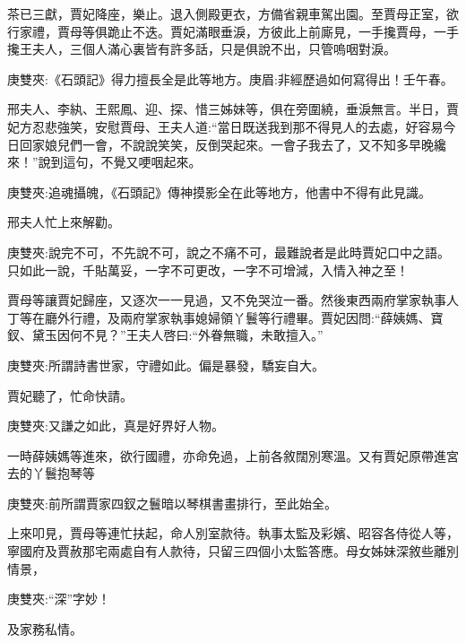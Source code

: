 \begin{parag}
    茶已三獻，賈妃降座，樂止。退入側殿更衣，方備省親車駕出園。至賈母正室，欲行家禮，賈母等俱跪止不迭。賈妃滿眼垂淚，方彼此上前廝見，一手攙賈母，一手攙王夫人，三個人滿心裏皆有許多話，只是俱說不出，只管嗚咽對淚。\begin{note}庚雙夾:《石頭記》得力擅長全是此等地方。庚眉:非經歷過如何寫得出！壬午春。\end{note}邢夫人、李紈、王熙鳳、迎、探、惜三姊妹等，俱在旁圍繞，垂淚無言。半日，賈妃方忍悲強笑，安慰賈母、王夫人道:“當日既送我到那不得見人的去處，好容易今日回家娘兒們一會，不說說笑笑，反倒哭起來。一會子我去了，又不知多早晚纔來！”說到這句，不覺又哽咽起來。\begin{note}庚雙夾:追魂攝魄，《石頭記》傳神摸影全在此等地方，他書中不得有此見識。\end{note}邢夫人忙上來解勸。\begin{note}庚雙夾:說完不可，不先說不可，說之不痛不可，最難說者是此時賈妃口中之語。只如此一說，千貼萬妥，一字不可更改，一字不可增減，入情入神之至！\end{note}賈母等讓賈妃歸座，又逐次一一見過，又不免哭泣一番。然後東西兩府掌家執事人丁等在廳外行禮，及兩府掌家執事媳婦領丫鬟等行禮畢。賈妃因問:“薛姨媽、寶釵、黛玉因何不見？”王夫人啓曰:“外眷無職，未敢擅入。”\begin{note}庚雙夾:所謂詩書世家，守禮如此。偏是暴發，驕妄自大。\end{note}賈妃聽了，忙命快請。\begin{note}庚雙夾:又謙之如此，真是好界好人物。\end{note}一時薛姨媽等進來，欲行國禮，亦命免過，上前各敘闊別寒溫。又有賈妃原帶進宮去的丫鬟抱琴等\begin{note}庚雙夾:前所謂賈家四釵之鬟暗以琴棋書畫排行，至此始全。\end{note}上來叩見，賈母等連忙扶起，命人別室款待。執事太監及彩嬪、昭容各侍從人等，寧國府及賈赦那宅兩處自有人款待，只留三四個小太監答應。母女姊妹深敘些離別情景，\begin{note}庚雙夾:“深”字妙！\end{note}及家務私情。
\end{parag}


